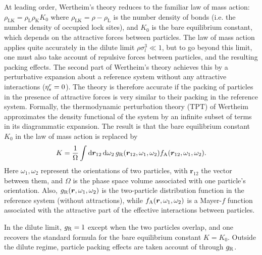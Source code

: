 \documentclass[10pt,onside,singlecolumn]{article}
\newcommand{\rhoL}{\rho_\mathrm{L}}
\newcommand{\rhoK}{\rho_\mathrm{K}}
\newcommand{\rhoLK}{\rho_\mathrm{LK}}
\begin{document}
At leading order, Wertheim's theory 
reduces to the familiar law of mass action: $\rhoLK = \rhoL \rhoK K_0$ where $\rhoLK = \rho - \rhoL$ is the number
density of bonds (i.e. the number density of occupied lock sites), and
$ K_0 $ is the bare 
equilibrium constant, which depends on the attractive forces between
particles.  
%
The law of mass action applies quite accurately in the dilute limit $\rho\sigma_l^3\ll 1$, but
to go beyond this limit, one must also take account of
repulsive forces between particles, and the resulting packing
effects. The second part of Wertheim's theory achieves this by a perturbative
expansion about a reference system without any attractive interactions ($\eta_s^r=0$).  
The theory is therefore accurate if the packing of particles in the
presence of attractive forces is very similar to their packing in the
reference system.  Formally, the thermodynamic perturbation theory
(TPT) of Wertheim approximates the density functional of the system by an
infinite subset of terms in its diagrammatic expansion.  The result is
that the bare equilibrium constant $ K_0 $ in the law of mass action is replaced by~\cite{Sciortino2007} 
%
\begin{equation}
K = \frac{1}{\Omega} 
\int \mathrm{d}\bm{r}_{12} \, \mathrm{d}\omega_2 \,  g_{\rm R}(\bm{r}_{12},\omega_1,\omega_2) 
f_{\rm A}(\bm{r}_{12},\omega_1,\omega_2)  .
\label{eq:TPT_K}
\end{equation}
%
Here $\omega_1,\omega_2$ represent the orientations of two particles, with $\bm{r}_{12}$ the vector between them,
and $\Omega$ is the phase space volume associated with one particle's orientation.
Also, $g_{\rm R}(\bm{r},\omega_1,\omega_2)$ is the two-particle distribution function in the reference
system (without attractions), while $f_{\rm A}(\bm{r},\omega_1,\omega_2)$ is a Mayer-$f$ function associated with
the attractive part of the effective interactions between particles.

In the dilute limit, $g_{\rm R}=1$ except when the two particles overlap, and
one recovers the standard formula for the bare equilibrium constant $K=K_0$.  Outside the dilute regime,
particle packing effects are taken account of through $g_{\rm R}$.
\end{document}
